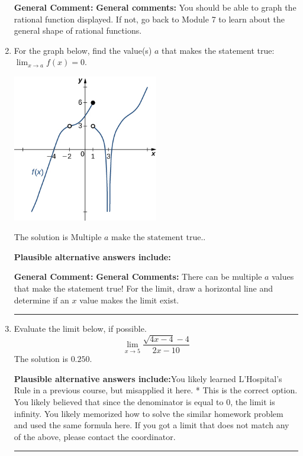 \documentclass{extbook}[14pt]
\newcommand{\litem}[1]{\item #1

\rule{\textwidth}{0.4pt}}
\begin{document}
\begin{enumerate}
{\begin{enumerate}[label=\Alph*.]
\end{enumerate}

\textbf{General Comment:} \textbf{General comments:} You should be able to graph the rational function displayed. If not, go back to Module 7 to learn about the general shape of rational functions.
}
\litem{
For the graph below, find the value(s) $a$ that makes the statement true: $ \displaystyle \lim_{x \rightarrow a} f(x) = 0$.

\begin{center}
    \includegraphics[width=0.5\textwidth]{../Figures/evaluateLimitGraphicallyCopyB.png}
\end{center}


The solution is \( \text{Multiple } a \text{ make the statement true}. \).\begin{enumerate}[label=\Alph*.]
\textbf{Plausible alternative answers include:}




\end{enumerate}

\textbf{General Comment:} \textbf{General Comments:} There can be multiple $a$ values that make the statement true! For the limit, draw a horizontal line and determine if an $x$ value makes the limit exist.
}
\litem{
Evaluate the limit below, if possible.
\[ \lim_{x \rightarrow 5} \frac{\sqrt{4x - 4} - 4}{2x - 10} \]The solution is \( 0.250 \).\begin{enumerate}[label=\Alph*.]
\textbf{Plausible alternative answers include:}You likely learned L'Hospital's Rule in a previous course, but misapplied it here.
* This is the correct option.
You likely believed that since the denominator is equal to 0, the limit is infinity.
You likely memorized how to solve the similar homework problem and used the same formula here.
If you got a limit that does not match any of the above, please contact the coordinator.
\end{enumerate}

}
\end{enumerate}
\end{document}
